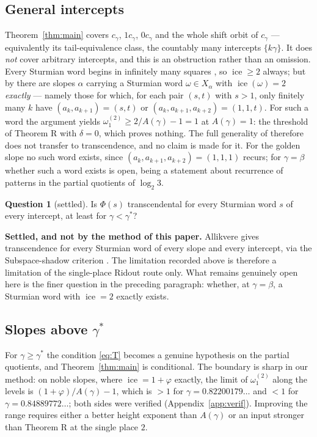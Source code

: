 \documentclass[11pt,reqno]{amsart}
\theoremstyle{plain}
\theoremstyle{definition}
\newtheorem{question}[theorem]{Question}
\DeclareMathOperator{\ice}{ice}
\newcommand{\PH}{\Phi}
\newcommand{\gs}{\gamma^{*}}
\newcommand{\Av}{A(\gamma)}
\newcommand{\om}{\omega_1^{(2)}}
\begin{document}
\subsection{General intercepts}\label{ss:intercepts}
Theorem~\ref{thm:main} covers $c_\gamma$, $1c_\gamma$, $0c_\gamma$ and the whole shift orbit of
$c_\gamma$ --- equivalently its tail-equivalence class, the countably many intercepts
$\{k\gamma\}$. It does \emph{not} cover arbitrary intercepts, and this is an obstruction rather than
an omission. Every Sturmian word begins in infinitely many squares \cite[Theorem 1]{ADQZ2001}, so
$\ice\ge2$ always; but by \cite[Theorem 1.1]{BHZ06} there are slopes $\alpha$ carrying a Sturmian
word $\omega\in X_\alpha$ with $\ice(\omega)=2$ \emph{exactly} --- namely those for which, for each
pair $(s,t)$ with $s>1$, only finitely many $k$ have $(a_k,a_{k+1})=(s,t)$ or
$(a_k,a_{k+1},a_{k+2})=(1,1,t)$. For such a word the argument yields $\om\ge2/\Av-1=1$ at $\Av=1$:
the threshold of Theorem R with $\delta=0$, which proves nothing. The full generality of
\cite[Corollary 10.5]{DJirr} therefore does not transfer to transcendence, and no claim is made for
it. For the golden slope no such word exists, since $(a_k,a_{k+1},a_{k+2})=(1,1,1)$ recurs; for
$\gamma=\beta$ whether such a word exists is open, being a statement about recurrence of patterns in
the partial quotients of $\log_2 3$.

\begin{question}[settled]\label{q:intercepts}
Is $\PH(s)$ transcendental for every Sturmian word $s$ of every intercept, at least for
$\gamma<\gs$?
\end{question}

\noindent
\textbf{Settled, and not by the method of this paper.} Allikvere
\cite[Theorem 5.4]{Allikvere26} gives transcendence for every Sturmian word of every slope and
every intercept, via the Subspace-shadow criterion \cite[Theorem 5.3]{Allikvere26}. The
limitation recorded above is therefore a limitation of the single-place Ridout route only. What
remains genuinely open here is the finer question in the preceding paragraph: whether, at
$\gamma=\beta$, a Sturmian word with $\ice=2$ exactly exists.

\subsection{Slopes above \texorpdfstring{$\gs$}{gamma*}}\label{ss:aboveg}
For $\gamma\ge\gs$ the condition \eqref{eq:T} becomes a genuine hypothesis on the partial quotients,
and Theorem~\ref{thm:main} is conditional. The boundary is sharp in our method: on noble slopes,
where $\ice=1+\varphi$ exactly, the limit of $\om$ along the levels is $(1+\varphi)/\Av-1$, which is
$>1$ for $\gamma=0.82200179\ldots$ and $<1$ for $\gamma=0.84889772\ldots$; both sides were verified
(Appendix~\ref{app:verif}). Improving the range requires either a better height exponent than $\Av$
or an input stronger than Theorem R at the single place $2$.
\end{document}
